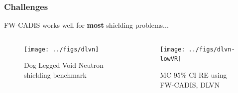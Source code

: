 \documentclass[xcolor=x11names,compress]{beamer}
\renewcommand{\(}{\begin{columns}}
\renewcommand{\)}{\end{columns}}
\newcommand{\<}[1]{\begin{column}{#1}}
\renewcommand{\>}{\end{column}}
\begin{document}
\begin{frame}[fragile]
  \frametitle{Challenges}

	FW-CADIS works well for \textbf{most} shielding problems...
	\begin{columns}
  	\begin{column}{0.5\textwidth}
  	\begin{figure}
  	\begin{center}
  		\texttt{[image: ../figs/dlvn]}
		\caption{Dog Legged Void Neutron shielding benchmark}
	\end{center}
  	\end{figure}
  	\end{column}
 	\begin{column}{0.5\textwidth}
 	\begin{figure}
  	\begin{center}
  		\texttt{[image: ../figs/dlvn-lowVR]}
  		\caption{MC 95\% CI RE using FW-CADIS, DLVN \cite{Slaybaugh2013}}
  	\end{center}
  	\end{figure}
  	\end{column}
	\end{columns}
  
\end{frame}
\end{document}

